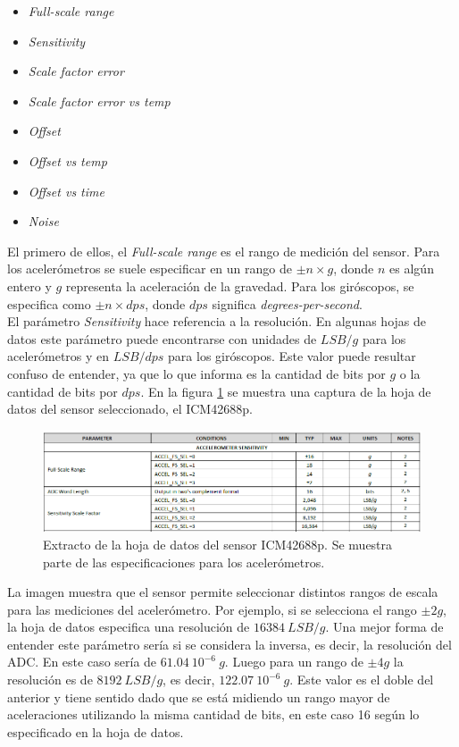 \begin{itemize}
    \item \textit{Full-scale range}
    \item \textit{Sensitivity}
    \item \textit{Scale factor error}
    \item \textit{Scale factor error vs temp}
    \item \textit{Offset}
    \item \textit{Offset vs temp}
    \item \textit{Offset vs time}
    \item \textit{Noise}
\end{itemize}

El primero de ellos, el \textit{Full-scale range} es el rango de medición del sensor. Para los acelerómetros se suele especificar en un rango de $\pm n \times g$, donde $n$ es algún entero y $g$ representa la aceleración de la gravedad. Para los giróscopos, se especifica como $\pm n \times dps$, donde $dps$ significa \textit{degrees-per-second}.\\

El parámetro \textit{Sensitivity} hace referencia a la resolución. En algunas hojas de datos este parámetro puede encontrarse con unidades de $LSB/g$ para los acelerómetros y en $LSB/dps$ para los giróscopos. Este valor puede resultar confuso de entender, ya que lo que informa es la cantidad de bits por $g$ o la cantidad de bits por $dps$. En la figura \ref{fig:ICM_42688_datasheet} se muestra una captura de la hoja de datos del sensor seleccionado, el ICM42688p. 

\begin{figure}[H]
    \centering
    \includegraphics[width=\textwidth]{img/ICM_42688_datasheet.png}
    \caption{Extracto de la hoja de datos del sensor ICM42688p. Se muestra parte de las especificaciones para los acelerómetros.}
    \label{fig:ICM_42688_datasheet}    
\end{figure}

La imagen muestra que el sensor permite seleccionar distintos rangos de escala para las mediciones del acelerómetro. Por ejemplo, si se selecciona el rango $\pm 2g$, la hoja de datos especifica una resolución de $16384 \ LSB/g$. Una mejor forma de entender este parámetro sería si se considera la inversa, es decir, la resolución del ADC. En este caso sería de $61.04 \ 10^{-6} \ g$. Luego para un rango de $\pm 4g$ la resolución es de $8192 \ LSB/g$, es decir, $122.07 \ 10^{-6} \ g$. Este valor es el doble del anterior y tiene sentido dado que se está midiendo un rango mayor de aceleraciones utilizando la misma cantidad de bits, en este caso 16 según lo especificado en la hoja de datos.\\

